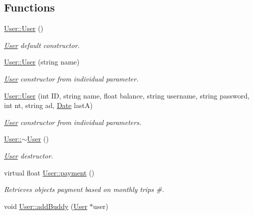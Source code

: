 \subsection*{Functions}
\begin{DoxyCompactItemize}
\item 
\mbox{\label{group___user_ga4a0137053e591fbb79d9057dd7d2283d}} 
\hyperlink{group___user_ga4a0137053e591fbb79d9057dd7d2283d}{User\+::\+User} ()
\begin{DoxyCompactList}\small\item\em \hyperlink{class_user}{User} default constructor. \end{DoxyCompactList}\item 
\hyperlink{group___user_gab4d18a829f31eae091669ac36782a396}{User\+::\+User} (string name)
\begin{DoxyCompactList}\small\item\em \hyperlink{class_user}{User} constructor from individual parameter. \end{DoxyCompactList}\item 
\hyperlink{group___user_ga4cad036bd4872821fa6c2585c8778461}{User\+::\+User} (int ID, string name, float balance, string username, string password, int nt, string ad, \hyperlink{class_date}{Date} lastA)
\begin{DoxyCompactList}\small\item\em \hyperlink{class_user}{User} constructor from individual parameters. \end{DoxyCompactList}\item 
\mbox{\label{group___user_gac00b72ad64eb4149f7b21b9f5468c2b2}} 
\hyperlink{group___user_gac00b72ad64eb4149f7b21b9f5468c2b2}{User\+::$\sim$\+User} ()
\begin{DoxyCompactList}\small\item\em \hyperlink{class_user}{User} destructor. \end{DoxyCompactList}\item 
virtual float \hyperlink{group___user_gac8563338d1d8086cd5485ad8c1ed4499}{User\+::payment} ()
\begin{DoxyCompactList}\small\item\em Retrieves object\textquotesingle{}s payment based on monthly trips \#. \end{DoxyCompactList}\item 
void \hyperlink{group___user_ga72cde56f7a6c5abcf8a22dcd6fdc8449}{User\+::add\+Buddy} (\hyperlink{class_user}{User} $\ast$user)

\end{DoxyCompactItemize}
